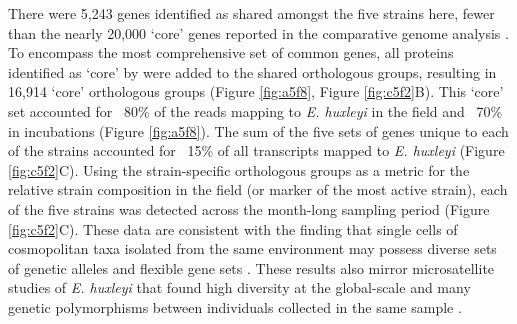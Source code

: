 There were 5,243 genes identified as shared amongst the five strains here, fewer than the nearly 20,000 `core' genes reported in the comparative genome analysis \citep{Read2013}. To encompass the most comprehensive set of common genes, all proteins identified as `core' by \citet{Read2013} were added to the shared orthologous groups, resulting in 16,914 `core' orthologous groups (Figure \ref{fig:a5f8}, Figure \ref{fig:c5f2}B). This `core' set accounted for ~80\% of the reads mapping to \textit{E. huxleyi} in the field and ~70\% in incubations (Figure \ref{fig:a5f8}). The sum of the five sets of genes unique to each of the strains accounted for ~15\% of all transcripts mapped to \textit{E. huxleyi} (Figure \ref{fig:c5f2}C). Using the strain-specific orthologous groups as a metric for the relative strain composition in the field (or marker of the most active strain), each of the five strains was detected across the month-long sampling period (Figure \ref{fig:c5f2}C).  These data are consistent with the finding that single cells of cosmopolitan taxa isolated from the same environment may possess diverse sets of genetic alleles and flexible gene sets \citep{Kashtan2014}. These results also mirror microsatellite studies of \textit{E. huxleyi} that found high diversity at the global-scale and many genetic polymorphisms between individuals collected in the same sample \citep{Iglesias-Rodriguez2006}. \par

